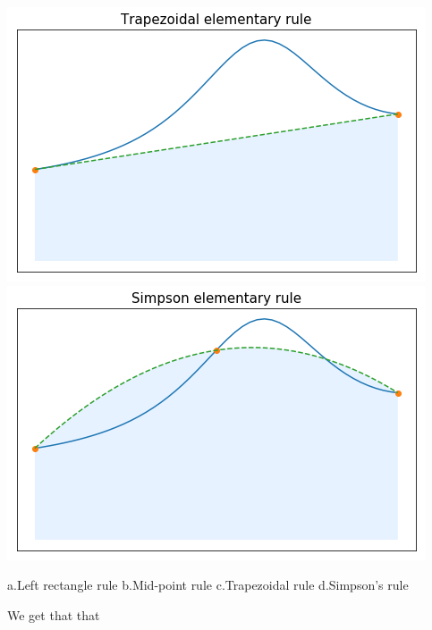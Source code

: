 \documentclass{article}
\begin{document}
        \includegraphics[scale=0.23]{Trap_Elem.png}
        \hspace{16pt}
        \includegraphics[scale=0.23]{Simpson_Elem.png}

        \hspace{1pt}
        a.Left rectangle rule
        \hspace{30pt} 
        b.Mid-point rule
        \hspace{44pt}
        c.Trapezoidal rule
        \hspace{44pt}
        d.Simpson's rule

        \vspace{10pt}

        We get that that
        
\end{document}
